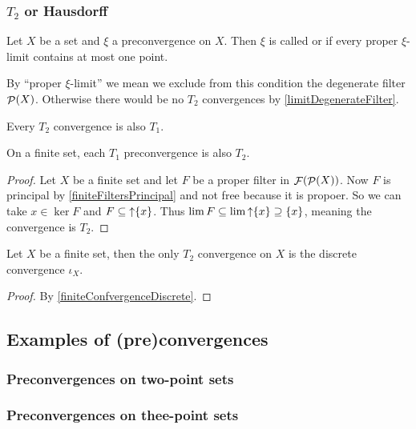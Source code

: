 \subsubsection{$T_2$ or Hausdorff}
\begin{definition}
Let $X$ be a set and $\xi$ a preconvergence on $X$. Then $\xi$ is called  or  if every proper $\xi$-limit contains at most one point.
\end{definition}
By ``proper $\xi$-limit'' we mean we exclude from this condition the degenerate filter $\mathop{\mathcal{P}}(X)$. Otherwise there would be no $T_2$ convergences by \ref{limitDegenerateFilter}.

\begin{lemma}
Every $T_2$ convergence is also $T_1$.
\end{lemma}

\begin{proposition}
On a finite set, each $T_1$ preconvergence is also $T_2$.
\end{proposition}
\begin{proof}
Let $X$ be a finite set and let $F$ be a proper filter in $\mathop{\mathcal{F}}(\mathop{\mathcal{P}}(X))$. Now $F$ is principal by \ref{finiteFiltersPrincipal} and not free because it is propoer. So we can take $x\in \ker F$ and $F \subseteq \mathop{\uparrow}\{x\}$. Thus $\lim F \subseteq \lim \mathop{\uparrow}\{x\} \supseteq \{x\}$, meaning the convergence is $T_2$.
\end{proof}
\begin{corollary}
Let $X$ be a finite set, then the only $T_2$ convergence on $X$ is the discrete convergence $\iota_X$.
\end{corollary}
\begin{proof}
By \ref{finiteConfvergenceDiscrete}.
\end{proof}




\subsection{Examples of (pre)convergences}
\subsubsection{Preconvergences on two-point sets}
\subsubsection{Preconvergences on thee-point sets}

